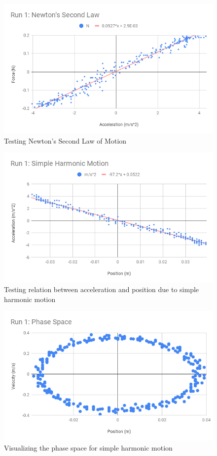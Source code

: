 \begin{figure}[ht]
    \centering
    \includegraphics[scale=0.71]{image/11-shm/run-1-newton.png}
    \caption{Testing Newton's Second Law of Motion}
    \label{figure.11.newton}
\end{figure}
\begin{figure}[ht]
    \centering
    \includegraphics[scale=0.71]{image/11-shm/run-1-shm.png}
    \caption{Testing relation between acceleration and position due to simple harmonic motion}
    \label{figure.11.ax}
\end{figure}
\begin{figure}[ht]
    \centering
    \includegraphics[scale=0.71]{image/11-shm/run-1-phase.png}
    \caption{Visualizing the phase space for simple harmonic motion}
    \label{figure.11.phase}
\end{figure}
